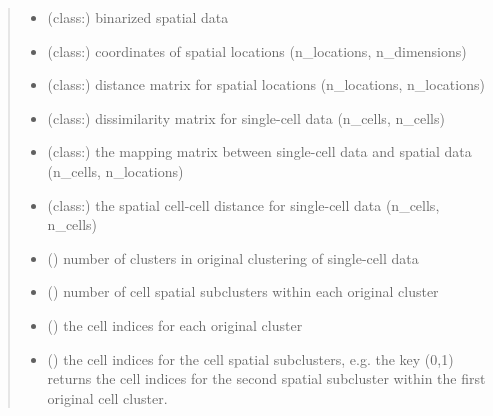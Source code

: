 \documentclass[letterpaper,10pt,english]{sphinxmanual}
\begin{document}
\begin{fulllineitems}
\begin{quote}
\begin{description}
\begin{itemize}
\item {} 
 (class:) \textendash{} binarized spatial data 

\item {} 
 (class:) \textendash{} coordinates of spatial locations (n\_locations, n\_dimensions) 

\item {} 
 (class:) \textendash{} distance matrix for spatial locations (n\_locations, n\_locations) 

\item {} 
 (class:) \textendash{} dissimilarity matrix for single-cell data (n\_cells, n\_cells) 

\item {} 
 (class:) \textendash{} the mapping matrix between single-cell data and spatial data (n\_cells, n\_locations) 

\item {} 
 (class:) \textendash{} the spatial cell-cell distance for single-cell data (n\_cells, n\_cells) 

\item {} 
 () \textendash{} number of clusters in original clustering of single-cell data 

\item {} 
 () \textendash{} number of cell spatial subclusters within each original cluster 

\item {} 
 () \textendash{} the cell indices for each original cluster 

\item {} 
 () \textendash{} the cell indices for the cell spatial subclusters, e.g. the key (0,1) returns the cell indices for the second spatial subcluster within the first original cell cluster. 


\end{itemize}
\end{description}
\end{quote}
\end{fulllineitems}
\end{document}
